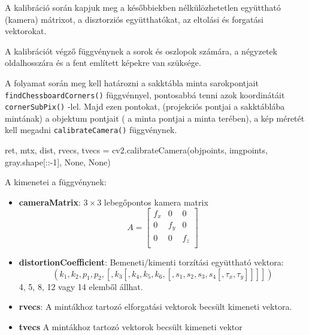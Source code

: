 A kalibráció során kapjuk meg a későbbiekben nélkülözhetetlen együttható (kamera) mátrixot, a disztorziós együtthatókat, az eltolási és forgatási vektorokat.

A kalibrációt végző függvénynek a sorok és oszlopok számára, a négyzetek oldalhosszára és a fent említett képekre van szüksége.

A folyamat során meg kell határozni a sakktábla minta sarokpontjait \\
\texttt{findChessboardCorners()} függvénnyel, pontosabbá tenni azok koordinátáit \\
\texttt{cornerSubPix()} -lel. Majd ezen pontokat, (projekciós pontjai a sakktáblába mintának) a objektum pontjait ( a minta pontjai a minta terében), a kép méretét kell megadni \texttt{calibrateCamera()} függvénynek. \\

\begin{python}
  ret, mtx, dist, rvecs, tvecs = cv2.calibrateCamera(objpoints,
   imgpoints, gray.shape[::-1], None, None)
\end{python} 

A kimenetei a függvénynek:
\begin{itemize}
\item {\bf cameraMatrix}: $3 \times 3$ lebegőpontos kamera matrix
\[
A = 
\begin{bmatrix}
	f_x & 0 & 0 \\
	0 & f_y & 0 \\
	0 & 0 & f_z \\
\end{bmatrix}
\]

\item {\bf distortionCoefficient}: Bemeneti/kimenti torzítási együttható vektora:
\[
(k_1, k_2, p_1, p_2, [, k_3 [, k_4, k_5, k_6, [, s_1, s_2, s_3, s_4 [, \tau_x, \tau_y]]]])
\]
4, 5, 8, 12 vagy 14 elemből állhat.

\item {\bf rvecs}: A mintákhoz tartozó elforgatási vektorok becsült kimeneti vektora.

\item {\bf tvecs}  A mintákhoz tartozó vektorok becsült kimeneti vektor
\end{itemize}


